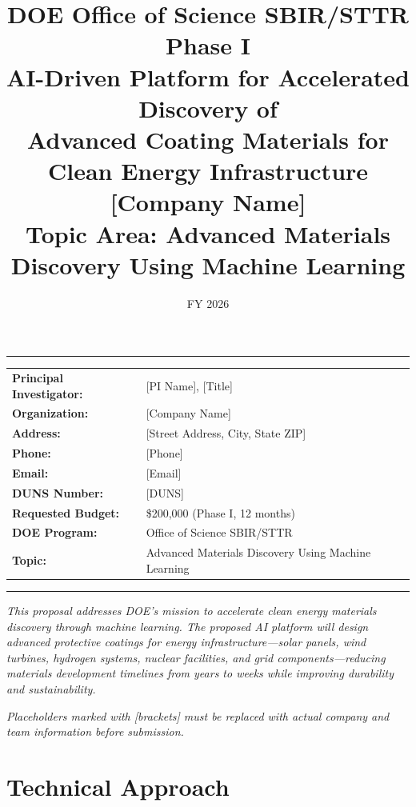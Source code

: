 \documentclass[11pt,letterpaper]{article}
\title{%
  \vspace{-1cm}
  \textcolor{doegreen}{\Large\textbf{DOE Office of Science SBIR/STTR Phase I}}\\[0.3cm]
  \textbf{AI-Driven Platform for Accelerated Discovery of\\Advanced Coating Materials for Clean Energy Infrastructure}\\[0.3cm]
  \large [Company Name]\\[0.2cm]
  \normalsize Topic Area: Advanced Materials Discovery Using Machine Learning
}
\author{}
\date{FY 2026}
\begin{document}
\maketitle
\thispagestyle{fancy}

\noindent\textcolor{doegreen}{\rule{\textwidth}{1.5pt}}

\vspace{0.3cm}
\begin{center}
\begin{tabular}{ll}
\textbf{Principal Investigator:} & [PI Name], [Title] \\
\textbf{Organization:} & [Company Name] \\
\textbf{Address:} & [Street Address, City, State ZIP] \\
\textbf{Phone:} & [Phone] \\
\textbf{Email:} & [Email] \\
\textbf{DUNS Number:} & [DUNS] \\
\textbf{Requested Budget:} & \$200,000 (Phase I, 12 months) \\
\textbf{DOE Program:} & Office of Science SBIR/STTR \\
\textbf{Topic:} & Advanced Materials Discovery Using Machine Learning \\
\end{tabular}
\end{center}

\vspace{0.3cm}
\noindent\textcolor{doegreen}{\rule{\textwidth}{1.5pt}}

\vspace{0.5cm}
\noindent\textit{This proposal addresses DOE's mission to accelerate clean energy materials discovery through machine learning. The proposed AI platform will design advanced protective coatings for energy infrastructure---solar panels, wind turbines, hydrogen systems, nuclear facilities, and grid components---reducing materials development timelines from years to weeks while improving durability and sustainability.}

\vspace{0.3cm}
\noindent\textit{Placeholders marked with [brackets] must be replaced with actual company and team information before submission.}

\section{Technical Approach}
\label{sec:technical}
\end{document}
